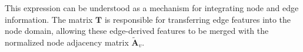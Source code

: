
This expression can be understood as a mechanism for integrating node and edge information. The matrix \( \mathbf{T} \) is responsible for transferring edge features into the node domain, allowing these edge-derived features to be merged with the normalized node adjacency matrix \( \tilde{\mathbf{A}}_v \). 



